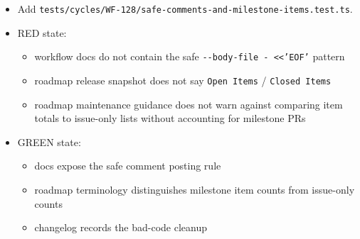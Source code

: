 \begin{itemize}
\tightlist
\item
  Add \texttt{t\allowbreak{}e\allowbreak{}s\allowbreak{}t\allowbreak{}s\allowbreak{}/\allowbreak{}c\allowbreak{}y\allowbreak{}c\allowbreak{}l\allowbreak{}e\allowbreak{}s\allowbreak{}/\allowbreak{}W\allowbreak{}F\allowbreak{}-\allowbreak{}1\allowbreak{}2\allowbreak{}8\allowbreak{}/\allowbreak{}s\allowbreak{}a\allowbreak{}f\allowbreak{}e\allowbreak{}-\allowbreak{}c\allowbreak{}o\allowbreak{}m\allowbreak{}m\allowbreak{}e\allowbreak{}n\allowbreak{}t\allowbreak{}s\allowbreak{}-\allowbreak{}a\allowbreak{}n\allowbreak{}d\allowbreak{}-\allowbreak{}m\allowbreak{}i\allowbreak{}l\allowbreak{}e\allowbreak{}s\allowbreak{}t\allowbreak{}o\allowbreak{}n\allowbreak{}e\allowbreak{}-\allowbreak{}i\allowbreak{}t\allowbreak{}e\allowbreak{}m\allowbreak{}s\allowbreak{}.\allowbreak{}t\allowbreak{}e\allowbreak{}s\allowbreak{}t\allowbreak{}.\allowbreak{}t\allowbreak{}s}.
\item
  RED state:

  \begin{itemize}
  \tightlist
  \item
    workflow docs do not contain the safe \texttt{-\allowbreak{}-\allowbreak{}b\allowbreak{}o\allowbreak{}d\allowbreak{}y\allowbreak{}-\allowbreak{}f\allowbreak{}i\allowbreak{}l\allowbreak{}e\allowbreak{} \allowbreak{}-\allowbreak{} \allowbreak{}<\allowbreak{}<\allowbreak{}'\allowbreak{}E\allowbreak{}O\allowbreak{}F\allowbreak{}'} pattern
  \item
    roadmap release snapshot does not say \texttt{O\allowbreak{}p\allowbreak{}e\allowbreak{}n\allowbreak{} \allowbreak{}I\allowbreak{}t\allowbreak{}e\allowbreak{}m\allowbreak{}s} / \texttt{C\allowbreak{}l\allowbreak{}o\allowbreak{}s\allowbreak{}e\allowbreak{}d\allowbreak{} \allowbreak{}I\allowbreak{}t\allowbreak{}e\allowbreak{}m\allowbreak{}s}
  \item
    roadmap maintenance guidance does not warn against comparing item totals to issue-only lists without accounting for milestone PRs
  \end{itemize}
\item
  GREEN state:

  \begin{itemize}
  \tightlist
  \item
    docs expose the safe comment posting rule
  \item
    roadmap terminology distinguishes milestone item counts from issue-only counts
  \item
    changelog records the bad-code cleanup
  \end{itemize}
\end{itemize}

